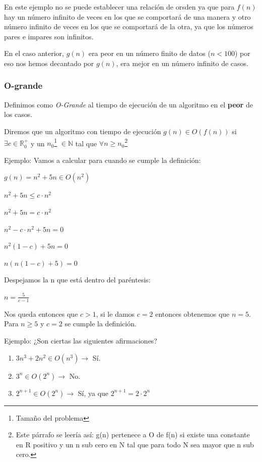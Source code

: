 \documentclass[10pt,a4paper,spanish]{report}
\begin{document}
\noindent
En este ejemplo no se puede establecer una relación de orsden ya que para $f(n)$ hay un número infinito de veces en los que se comportará de una manera y otro número infinito de veces en los que se comportará de la otra, ya que los números pares e impares son infinitos.

\noindent
En el caso anterior, $g(n)$ era peor en un número finito de datos ($n<100$) por eso nos hemos decantado por $g(n)$, era mejor en un número infinito de casos.

\subsubsection{\textcolor[rgb]{0.1,0.2,0.6}O-grande}

\noindent
Definimos como \textit{\textcolor[rgb]{0.1,0.2,0.6}{O-Grande}} al tiempo de ejecución de un algoritmo en el \textbf{peor} de los casos.

\noindent
Diremos que un algoritmo con tiempo de ejecución $g(n) \in O(f(n))$ si $\exists c \in \mathbb{R}_{0}^{+}$ y un $n_{0}$\footnote{Tamaño del problema} $\in \mathbb{N}$ tal que $\forall n \geq n_{0}$\footnote{Este párrafo se leería así: g(n) pertenece a O de f(n) si existe una constante en R positivo y un n sub cero en N tal que para todo N sea mayor que n sub cero.}

\noindent
Ejemplo: Vamos a calcular para cuando se cumple la definición:
\begin{center}
$g(n) = n^{2} + 5n \in O(n^{2})$

$n^{2} + 5n \leq c \cdot n^{2}$

$n^{2} + 5n = c \cdot n^{2}$

$n^{2} - c \cdot n^{2} + 5n = 0$

$n^{2}(1 - c) + 5n = 0$

$n(n(1-c) + 5) = 0$

Despejamos la n que está dentro del paréntesis:

$n = \frac{5}{c-1}$

Nos queda entonces que $c > 1$, si le damos $c = 2$ entonces obtenemos que $n = 5$. Para $n \geq 5$ y $c = 2$ se cumple la definición.
\end{center}

\noindent
Ejemplo: ¿Son ciertas las siguientes afirmaciones?
\begin{enumerate}[$\bullet$]
\item $3n^{3} + 2n^{2} \in O(n^{3}) \longrightarrow$ Sí.
\item $3^{n} \in O(2^{n}) \longrightarrow$ No.
\item $2^{n+1} \in O(2^{n}) \longrightarrow$ Sí, ya que $2^{n+1} = 2 \cdot 2^{n}$
\end{enumerate}
\end{document}
